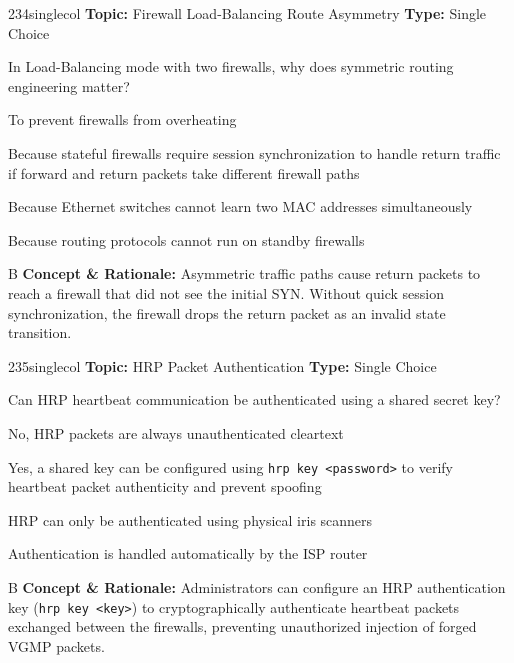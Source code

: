 \begin{qcard}{234}{singlecol}
\textcolor{darkslate!75}{\small\textbf{Topic:} Firewall Load-Balancing Route Asymmetry \hfill \textbf{Type:} Single Choice}\vspace{0.4em}\par
In Load-Balancing mode with two firewalls, why does symmetric routing engineering matter?
\begin{qoptions}
\item To prevent firewalls from overheating
\item Because stateful firewalls require session synchronization to handle return traffic if forward and return packets take different firewall paths
\item Because Ethernet switches cannot learn two MAC addresses simultaneously
\item Because routing protocols cannot run on standby firewalls
\end{qoptions}
\end{qcard}
\nopagebreak
\begin{explainbox}{B}
\textbf{Concept \& Rationale:} Asymmetric traffic paths cause return packets to reach a firewall that did not see the initial SYN. Without quick session synchronization, the firewall drops the return packet as an invalid state transition.
\end{explainbox}

\begin{qcard}{235}{singlecol}
\textcolor{darkslate!75}{\small\textbf{Topic:} HRP Packet Authentication \hfill \textbf{Type:} Single Choice}\vspace{0.4em}\par
Can HRP heartbeat communication be authenticated using a shared secret key?
\begin{qoptions}
\item No, HRP packets are always unauthenticated cleartext
\item Yes, a shared key can be configured using \texttt{hrp key \textless{}password\textgreater{}} to verify heartbeat packet authenticity and prevent spoofing
\item HRP can only be authenticated using physical iris scanners
\item Authentication is handled automatically by the ISP router
\end{qoptions}
\end{qcard}
\nopagebreak
\begin{explainbox}{B}
\textbf{Concept \& Rationale:} Administrators can configure an HRP authentication key (\texttt{hrp key \textless{}key\textgreater{}}) to cryptographically authenticate heartbeat packets exchanged between the firewalls, preventing unauthorized injection of forged VGMP packets.
\end{explainbox}

